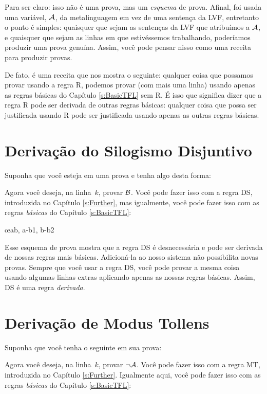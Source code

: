 Para ser claro: isso não é uma prova, mas um \emph{esquema} de prova. Afinal, foi usada  uma variável, $\mathcal{A}$, da metalinguagem  em vez de uma sentença da LVF, entretanto o ponto é simples: quaisquer que sejam as sentenças da LVF que atribuímos a $\mathcal{A}$, e quaisquer que sejam as linhas em que estivéssemos trabalhando, poderíamos produzir uma  prova genuína. Assim, você pode pensar nisso como uma receita para produzir provas.

De fato, é uma receita que nos mostra o seguinte: qualquer coisa que possamos provar usando a regra R, podemos provar (com mais uma linha) usando apenas as regras básicas do Capítulo \ref{s:BasicTFL} sem R. É isso que significa dizer que a regra R pode ser derivada de outras regras básicas: qualquer coisa que possa ser justificada usando R pode ser justificada usando apenas as outras regras básicas.

\section{Derivação do Silogismo Disjuntivo}
Suponha que você esteja em uma prova e tenha algo desta forma:
\begin{fitchproof}
\end{fitchproof}
Agora você deseja, na linha~$k$, provar $\mathcal{B}$. Você pode fazer isso com a regra DS, introduzida no Capítulo \ref{s:Further}, mas igualmente, você pode fazer isso com as regras  \emph{básicas} do Capítulo \ref{s:BasicTFL}:
 

	\begin{fitchproof}
		\open
		\close
		\open
		\close
	\oe{ab, a-b1, b-b2}
\end{fitchproof}
Esse esquema de prova mostra que a regra DS é desnecessária e pode ser derivada de nossas regras mais básicas. Adicioná-la ao nosso sistema não possibilita novas provas. Sempre  que você usar a regra DS, você pode provar a mesma coisa usando algumas linhas extras aplicando apenas as nossas regras básicas. Assim, DS é uma regra \emph{derivada}.

\section{Derivação de Modus Tollens}
Suponha que você tenha o seguinte em sua prova:
\begin{fitchproof}
\end{fitchproof}
Agora você deseja, na linha~$k$, provar $\neg \mathcal{A}$. Você pode fazer isso com a regra  MT, introduzida no Capítulo \ref{s:Further}.  Igualmente aqui, você pode fazer isso com as regras  \emph{básicas} do Capítulo \ref{s:BasicTFL}:
 
